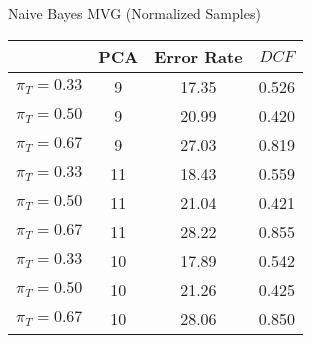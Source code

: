 \caption{Naive Bayes MVG (Normalized Samples)}\label{tab:mvgn_naiveacctable}
\begin{center}
\begin{tabular}{|c|c||c|c|}
\hline
\ & PCA & Error Rate & $DCF$\\
\hline
$\pi_T = 0.33$ & 9 & 17.35 & 0.526 \\
$\pi_T = 0.50$ & 9 & 20.99 & 0.420 \\
$\pi_T = 0.67$ & 9 & 27.03 & 0.819 \\
\hline
$\pi_T = 0.33$ & 11 & 18.43 & 0.559 \\
$\pi_T = 0.50$ & 11 & 21.04 & 0.421 \\
$\pi_T = 0.67$ & 11 & 28.22 & 0.855 \\
\hline
$\pi_T = 0.33$ & 10 & 17.89 & 0.542 \\
$\pi_T = 0.50$ & 10 & 21.26 & 0.425 \\
$\pi_T = 0.67$ & 10 & 28.06 & 0.850 \\
\hline
\end{tabular}
\end{center}
